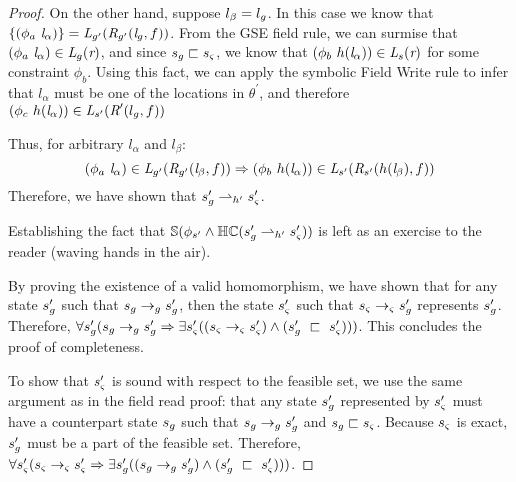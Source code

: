 \begin{proof}
On the other hand, suppose $l_\beta = l_{g}$. In this case we know that $\{(\phi_a\ \emph{l}_\alpha)\} = \emph{L}_{g^\prime}(\emph{R}_{g^\prime}(\emph{l}_{g},f ))$. From the GSE field rule, we can surmise that $(\phi_a\ \emph{l}_\alpha) \in \emph{L}_{g}(\emph{r} )$, and since $s_{g} \sqsubset s_{\varsigma}$, we know that $(\phi_b\ h(\emph{l}_\alpha)) \in \emph{L}_{s}(\emph{r})$ for some constraint $\phi_b$. Using this fact, we can apply the symbolic Field Write rule to infer that $l_\alpha$ must be one of the locations in $\theta^\prime$, and therefore $(\phi_c\ h(\emph{l}_\alpha)) \in \emph{L}_{s^\prime}(\emph{R}^\prime(l_{g},f))$

Thus, for arbitrary $l_\alpha$ and $l_\beta$:
$$(\phi_a\ \emph{l}_\alpha) \in \emph{L}_{g^\prime}(\emph{R}_{g^\prime}(\emph{l}_\beta,f )) \Rightarrow (\phi_b\ h(\emph{l}_\alpha))\in \emph{L}_{s^\prime}(\emph{R}_{s^\prime} (h(\emph{l}_\beta),f ))$$
Therefore, we have shown that $s_{g}^\prime \rightharpoonup_{h^\prime} s_{\varsigma}^\prime$.

Establishing the fact that $\mathbb{S}(\phi_{s^\prime} \wedge \mathbb{HC}(s_{g}^\prime \rightharpoonup_{h^\prime} s_{\varsigma}^\prime) )$ is left as an exercise to the reader (waving hands in the air).

By proving the existence of a valid homomorphism, we have shown that for any state $s_{g}^\prime$ such that $s_{g} \rightarrow_{g} s_{g}^\prime$, then the state $s_{\varsigma}^\prime$ such that $s_{\varsigma} \rightarrow_{\varsigma} s_{g}^\prime$ represents $s_{g}^\prime$. Therefore, $\forall s_{g}^\prime ( s_{g} \rightarrow_{g} s_{g}^\prime \Rightarrow \exists s_{\varsigma}^\prime( (s_{\varsigma} \rightarrow_{\varsigma} s_{\varsigma}^\prime )\wedge (s_{g}^\prime\ \sqsubset\ s_{\varsigma}^\prime ))  )$. This concludes the proof of completeness.

To show that $s_{\varsigma}^\prime$ is sound with respect to the feasible set, we use the same argument as in the field read proof: that any state $s_{g}^\prime$ represented by $s_{\varsigma}^\prime$ must have a counterpart state $s_{g}$ such that $s_{g} \rightarrow_{g} s_{g}^\prime$ and $s_{g} \sqsubset s_{\varsigma}$. Because $s_{\varsigma}$ is exact, $s_{g}^\prime$ must be a part of the feasible set. Therefore, $\forall s_\sym^\prime ( s_\sym \rsym s_\sym^\prime\Rightarrow \exists s_\gse^\prime( (s_\gse \rgse s_\gse^\prime )\wedge (s_\gse^\prime\ \sqsubset\ s_\sym^\prime ))  )$.

\end{proof}


